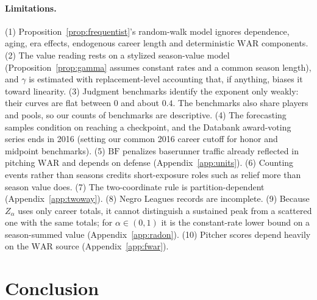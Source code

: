 \documentclass[11pt,letterpaper]{article}
\theoremstyle{plain}
\theoremstyle{definition}
\theoremstyle{remark}
\newcommand{\WAR}{\mathrm{WAR}}
\newcommand{\BF}{\mathrm{BF}}
\begin{document}
\paragraph{Limitations.} (1) Proposition~\ref{prop:frequentist}'s random-walk model ignores dependence, aging, era effects, endogenous career length and deterministic $\WAR$ components. (2) The value reading rests on a stylized season-value model (Proposition~\ref{prop:gamma} assumes constant rates and a common season length), and $\gamma$ is estimated with replacement-level accounting that, if anything, biases it toward linearity. (3) Judgment benchmarks identify the exponent only weakly: their curves are flat between $0$ and about $0.4$. The benchmarks also share players and pools, so our counts of benchmarks are descriptive. (4) The forecasting samples condition on reaching a checkpoint, and the Databank award-voting series ends in 2016 (setting our common 2016 career cutoff for honor and midpoint benchmarks). (5) $\BF$ penalizes baserunner traffic already reflected in pitching $\WAR$ and depends on defense (Appendix~\ref{app:units}). (6) Counting events rather than seasons credits short-exposure roles such as relief more than season value does. (7) The two-coordinate rule is partition-dependent (Appendix~\ref{app:twoway}). (8) Negro Leagues records are incomplete. (9) Because $Z_\alpha$ uses only career totals, it cannot distinguish a sustained peak from a scattered one with the same totals; for $\alpha \in (0,1)$ it is the constant-rate lower bound on a season-summed value (Appendix~\ref{app:radon}). (10) Pitcher scores depend heavily on the $\WAR$ source (Appendix~\ref{app:fwar}).

\section{Conclusion}
\end{document}
